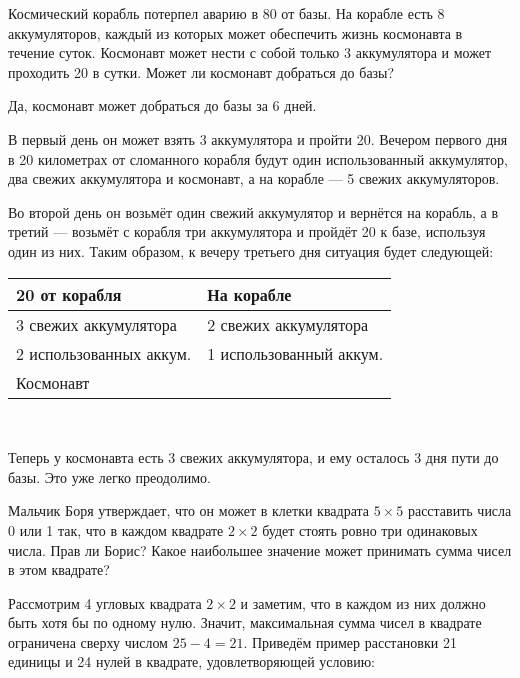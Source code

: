 
\def\km#1{\SI{#1}{\text{км}}}

\begin{enumerate}

	\itA Космический корабль потерпел аварию в \km{80} от базы. На корабле есть 8 аккумуляторов, каждый из которых может обеспечить жизнь космонавта в течение суток. Космонавт может нести с собой только 3 аккумулятора и может проходить \km{20} в сутки. Может ли космонавт добраться до базы?
	
	\itr Да, космонавт может добраться до базы за 6 дней.
	
	В первый день он может взять 3 аккумулятора и пройти \km{20}. Вечером первого дня в 20 километрах от сломанного корабля будут один использованный аккумулятор, два свежих аккумулятора и космонавт, а на корабле — 5 свежих аккумуляторов.
	
	Во второй день он возьмёт один свежий аккумулятор и вернётся на корабль, а в третий — возьмёт с корабля три аккумулятора и пройдёт \km{20} к базе, используя один из них. Таким образом, к вечеру третьего дня ситуация будет следующей:
	
	\begin{center}\begin{tabular}{|l|l|} \hline
		\km{20} от корабля & На корабле \\ \hline
	 	3 свежих аккумулятора & 2 свежих аккумулятора \\
	 	2 использованных аккум. & 1 использованный аккум. \\
	 	Космонавт & \\ \hline
	\end{tabular}\medskip \\\end{center}
	
	Теперь у космонавта есть 3 свежих аккумулятора, и ему осталось 3 дня пути до базы. Это уже легко преодолимо.

	\itB Мальчик Боря утверждает, что он может в клетки квадрата $5\times 5$ расставить числа 0 или 1 так, что в каждом квадрате $2\times 2$ будет стоять ровно три одинаковых числа. Прав ли Борис? Какое наибольшее значение может принимать сумма чисел в этом квадрате?
	
	\itr Рассмотрим 4 угловых квадрата $2 \times 2$ и заметим, что в каждом из них должно быть хотя бы по одному нулю. Значит, максимальная сумма чисел в квадрате ограничена сверху числом $25-4=21$. Приведём пример расстановки 21 единицы и 24 нулей в квадрате, удовлетворяющей условию:
	

\end{enumerate}
